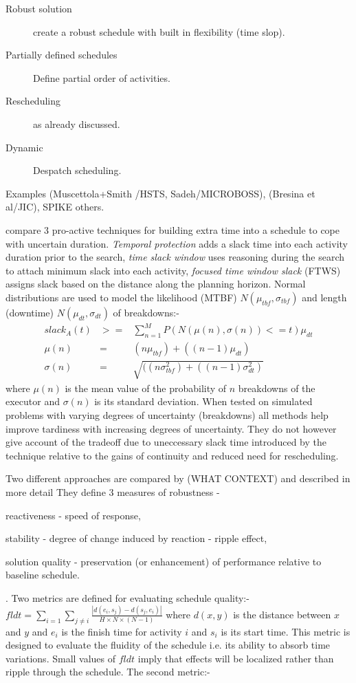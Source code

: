 \begin{description}
\item[Robust solution] create a robust schedule with built in flexibility (time slop).
\item[Partially defined schedules] Define partial order of activities.
\item[Rescheduling] as already discussed.
\item[Dynamic] Despatch scheduling.
\end{description}

Examples (Muscettola+Smith /HSTS, Sadeh/MICROBOSS), (Bresina et al/JIC), SPIKE others.

\cite{davenport01slack} compare 3 pro-active techniques for building extra time into a schedule to cope with uncertain duration. \emph{Temporal protection} adds a slack time into each activity duration prior to the search, \emph{time slack window} uses reasoning during the search to attach minimum slack into each activity, \emph{focused time window slack} (FTWS) assigns slack based on the distance along the planning horizon. Normal distributions  are used to model the likelihood (MTBF) $N(\mu_{tbf}, \sigma_{tbf})$ and length (downtime) $N(\mu_{dt}, \sigma_{dt})$ of breakdowns:-
\begin{eqnarray}
slack_A(t) & >= & \sum_{n=1}^M P(N(\mu(n),\sigma(n)) <= t)  \mu_{dt} \\
\mu(n) & = & (n \mu_{tbf}) + ((n-1) \mu_{dt}) \\
\sigma(n) & = & \sqrt{((n \sigma_{tbf}^2) + ((n-1) \sigma_{dt}^2)}
\end{eqnarray}
where $\mu(n)$ is the mean value of the probability of $n$ breakdowns of the executor and $\sigma(n)$ is its standard deviation. When tested on simulated problems with varying degrees of uncertainty (breakdowns) all methods help improve tardiness with increasing degrees of uncertainty. They do not however give account of the tradeoff due to uneccessary slack time introduced by the technique relative to the gains of continuity and reduced need for rescheduling.


Two different approaches are compared by \cite{policella03flexible} (WHAT CONTEXT) and described in more detail \cite{policella05thesis} 
They define 3 measures of robustness - \begin{inparaenum}\item reactiveness - speed of response, \item stability - degree of change induced by reaction - ripple effect, \item solution quality - preservation (or enhancement) of performance relative to baseline schedule.\end{inparaenum}. Two metrics are defined for evaluating schedule quality:-
$fldt = \sum_{i=1} \sum_{j \neq i} \frac { |d(e_i,s_j) - d(s_j, e_i)|}{ H \times N \times (N-1)}$
where $d(x,y)$ is the distance between $x$ and $y$ and $e_i$ is the finish time for activity $i$ and $s_i$ is its start time. This metric is designed to evaluate the fluidity of the schedule i.e. its ability to absorb time variations. Small values of $fldt$ imply that effects will be localized rather than ripple through the schedule. The second metric:-

